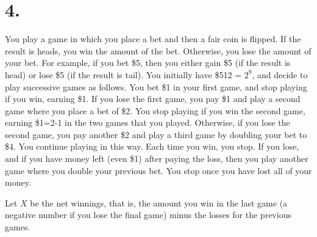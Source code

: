 \documentclass{article}
\begin{document}
\section*{4.}
{\Large 
You play a game in which you place a bet and then a fair coin is flipped. If the result is heads, you win the
amount of the bet. Otherwise, you lose the amount of your bet.
For example, if you bet \$5, then you either gain \$5 (if the result is head) or lose \$5 (if the result is tail).
You initially have \$512 = $2^9$, and decide to play successive games as follows. You bet \$1 in your first game, and stop playing if you win, earning \$1. If you lose the first game, you pay \$1 and play a second game where you place a bet of \$2. You stop playing if you win the second game, earning \$1=2-1 in the two games that you played. Otherwise, if you lose the second game, you pay another \$2 and play a third game by doubling your bet to \$4. You continue playing in this way. Each time you win, you stop. If you lose, and if you have money left (even \$1) after paying the loss, then you play another game where you double your previous bet.
You stop once you have lost all of your money. 

Let $X$ be the net winnings, that is, the amount you win in the last game 
(a negative number if you lose the final game) minus the losses for the previous games.

}
\end{document}
